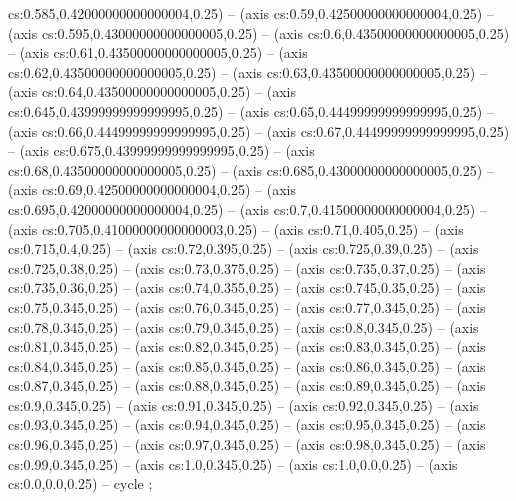 cs:0.585,0.42000000000000004,0.25) -- (axis cs:0.59,0.42500000000000004,0.25) -- (axis cs:0.595,0.43000000000000005,0.25) -- (axis cs:0.6,0.43500000000000005,0.25) -- (axis cs:0.61,0.43500000000000005,0.25) -- (axis cs:0.62,0.43500000000000005,0.25) -- (axis cs:0.63,0.43500000000000005,0.25) -- (axis cs:0.64,0.43500000000000005,0.25) -- (axis cs:0.645,0.43999999999999995,0.25) -- (axis cs:0.65,0.44499999999999995,0.25) -- (axis cs:0.66,0.44499999999999995,0.25) -- (axis cs:0.67,0.44499999999999995,0.25) -- (axis cs:0.675,0.43999999999999995,0.25) -- (axis cs:0.68,0.43500000000000005,0.25) -- (axis cs:0.685,0.43000000000000005,0.25) -- (axis cs:0.69,0.42500000000000004,0.25) -- (axis cs:0.695,0.42000000000000004,0.25) -- (axis cs:0.7,0.41500000000000004,0.25) -- (axis cs:0.705,0.41000000000000003,0.25) -- (axis cs:0.71,0.405,0.25) -- (axis cs:0.715,0.4,0.25) -- (axis cs:0.72,0.395,0.25) -- (axis cs:0.725,0.39,0.25) -- (axis cs:0.725,0.38,0.25) -- (axis cs:0.73,0.375,0.25) -- (axis cs:0.735,0.37,0.25) -- (axis cs:0.735,0.36,0.25) -- (axis cs:0.74,0.355,0.25) -- (axis cs:0.745,0.35,0.25) -- (axis cs:0.75,0.345,0.25) -- (axis cs:0.76,0.345,0.25) -- (axis cs:0.77,0.345,0.25) -- (axis cs:0.78,0.345,0.25) -- (axis cs:0.79,0.345,0.25) -- (axis cs:0.8,0.345,0.25) -- (axis cs:0.81,0.345,0.25) -- (axis cs:0.82,0.345,0.25) -- (axis cs:0.83,0.345,0.25) -- (axis cs:0.84,0.345,0.25) -- (axis cs:0.85,0.345,0.25) -- (axis cs:0.86,0.345,0.25) -- (axis cs:0.87,0.345,0.25) -- (axis cs:0.88,0.345,0.25) -- (axis cs:0.89,0.345,0.25) -- (axis cs:0.9,0.345,0.25) -- (axis cs:0.91,0.345,0.25) -- (axis cs:0.92,0.345,0.25) -- (axis cs:0.93,0.345,0.25) -- (axis cs:0.94,0.345,0.25) -- (axis cs:0.95,0.345,0.25) -- (axis cs:0.96,0.345,0.25) -- (axis cs:0.97,0.345,0.25) -- (axis cs:0.98,0.345,0.25) -- (axis cs:0.99,0.345,0.25) -- (axis cs:1.0,0.345,0.25) -- (axis cs:1.0,0.0,0.25) -- (axis cs:0.0,0.0,0.25) -- cycle
;
